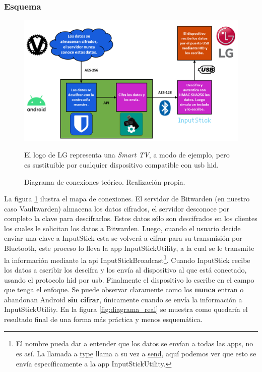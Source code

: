 \subsubsection{Esquema}
\begin{figure}[H]
    \centering
    \includegraphics[width=\textwidth]{gfx/Diagrama2.png}
    \caption{Diagrama de conexiones teórico. Realización propia.}
    \label{fig:diagrama}
    El logo de LG representa una \textit{Smart TV}, a modo de ejemplo, pero es sustituible por cualquier dispositivo compatible con \gls{usb} \gls{hid}.
\end{figure}

 La figura \ref{fig:diagrama} ilustra el mapa de conexiones. El servidor de Bitwarden (en nuestro caso Vaultwarden) almacena los datos cifrados, el servidor desconoce por completo la clave para descifrarlos. Estos datos sólo son descifrados en los clientes los cuales le solicitan los datos a Bitwarden. Luego, cuando el usuario decide enviar una clave a InputStick esta se volverá a cifrar para su transmisión por Bluetooth, este proceso lo lleva la app InputStickUtility, a la cual se le transmite la información mediante la \gls{api} InputStickBroadcast\footnote{El nombre pueda dar a entender que los datos se envían a todas las apps, no es así. La llamada a \href{https://github.com/inputstick/InputStickAPI-Android/blob/81d9ce96aa9e4db4f508090f54bea981ffecfcb7/InputStickAPI/src/com/inputstick/api/broadcast/InputStickBroadcast.java\#L208}{type} llama a su vez a \href{https://github.com/inputstick/InputStickAPI-Android/blob/81d9ce96aa9e4db4f508090f54bea981ffecfcb7/InputStickAPI/src/com/inputstick/api/broadcast/InputStickBroadcast.java\#L420}{send}, aquí podemos ver que esto se envía específicamente a la app InputStickUtility.}. Cuando InputStick recibe los datos a escribir los descifra y los envía al dispositivo al que está conectado, usando el protocolo \gls{hid} por \gls{usb}. Finalmente el dispositivo lo escribe en el campo que tenga el enfoque. Se puede observar claramente como los \textbf{nunca} entran o abandonan Android \textbf{sin cifrar}, únicamente cuando se envía la información a InputStickUtility. En la figura \ref{fig:diagrama_real} se muestra como quedaría el resultado final de una forma más práctica y menos esquemática.

